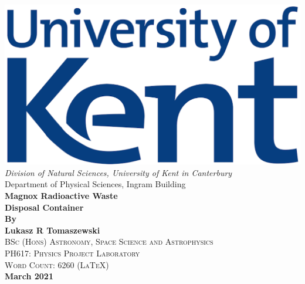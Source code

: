 \begin{titlepage}
\newcommand{\HRule}{\rule{\linewidth}{0.5mm}}
\begin{centering} 
\includegraphics[scale=0.6]{Media/Document/Uni_of_Kent.png}\\
\vspace{1.0cm} 
\large{\emph{Division of Natural Sciences, University of Kent in Canterbury}} \\ [0.1cm]
\large{Department of Physical Sciences, Ingram Building} \\ [1.0cm]
\Huge{\bfseries{Magnox Radioactive Waste \\ Disposal Container}} \\ [1.0cm]
{\Large \bfseries{By \\ [0.2cm] Lukasz R Tomaszewski}}\\[0.2cm]
\textsc{\large BSc (Hons) Astronomy, Space Science and Astrophysics}\\ [-0.2cm]
\textsc{\large PH617: Physics Project Laboratory}\\ [-0.2cm]
\textsc{\large Word Count: 6260 (LaTeX)}\\ [1.5cm]
{\Large \bfseries{March 2021}}\\
\end{centering} 
\end{titlepage}
\newpage
\begin{titlepage}
\begin{tableofcontents}
\end{tableofcontents}
\end{titlepage}
\newpage